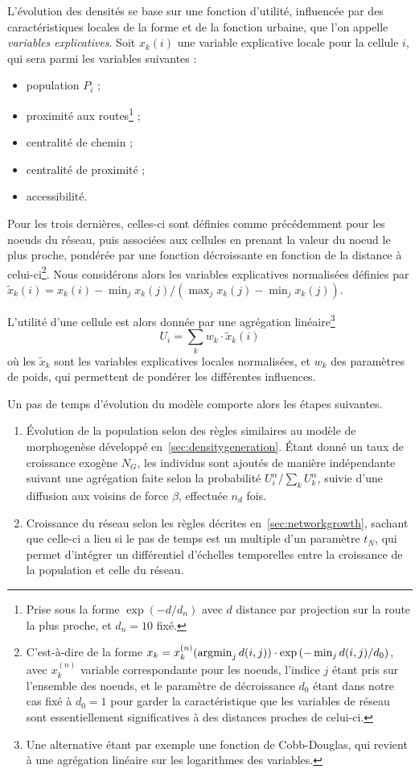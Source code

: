 L'évolution des densités se base sur une fonction d'utilité, influencée par des caractéristiques locales de la forme et de la fonction urbaine, que l'on appelle \emph{variables explicatives}. Soit $x_k(i)$ une variable explicative locale pour la cellule $i$, qui sera parmi les variables suivantes : 
\begin{itemize}
	\item population $P_i$ ;
	\item proximité aux routes\footnote{Prise sous la forme $\exp (-d / d_n)$ avec $d$ distance par projection sur la route la plus proche, et $d_n =10$ fixé.} ;
	\item centralité de chemin ;
	\item centralité de proximité ;
	\item accessibilité.
\end{itemize}
Pour les trois dernières, celles-ci sont définies comme précédemment pour les noeuds du réseau, puis associées aux cellules en prenant la valeur du noeud le plus proche, pondérée par une fonction décroissante en fonction de la distance à celui-ci\footnote{C'est-à-dire de la forme $x_k = x^{(n)}_k (\operatorname*{\arg\!\min}_j d(i,j)) \cdot \exp \left( -  \min_j d(i,j) / d_0 \right)$, avec $x^{(n)}_k$ variable correspondante pour les noeuds, l'indice $j$ étant pris sur l'ensemble des noeuds, et le paramètre de décroissance $d_0$ étant dans notre cas fixé à $d_0 = 1$ pour garder la caractéristique que les variables de réseau sont essentiellement significatives à des distances proches de celui-ci.}. Nous considérons alors les variables explicatives normalisées définies par $\tilde{x}_k(i) = x_k(i) - \min_j x_k(j) / (\max_j x_k(j) - \min_j x_k(j))$. 

L'utilité d'une cellule est alors donnée par une agrégation linéaire\footnote{Une alternative étant par exemple une fonction de Cobb-Douglas, qui revient à une agrégation linéaire sur les logarithmes des variables.}
\begin{equation}
U_i = \sum_k w_k \cdot \tilde{x}_k(i)
\end{equation}
où les $\tilde{x}_k$ sont les variables explicatives locales normalisées, et $w_k$ des paramètres de poids, qui permettent de pondérer les différentes influences.


Un pas de temps d'évolution du modèle comporte alors les étapes suivantes.
\begin{enumerate}
	\item Évolution de la population selon des règles similaires au modèle de morphogenèse développé en~\ref{sec:densitygeneration}. Étant donné un taux de croissance exogène $N_G$, les individus sont ajoutés de manière indépendante suivant une agrégation faite selon la probabilité $U_i^\alpha/\sum_k U_k^\alpha$, suivie d'une diffusion aux voisins de force $\beta$, effectuée $n_d$ fois.
	\item Croissance du réseau selon les règles décrites en~\ref{sec:networkgrowth}, sachant que celle-ci a lieu si le pas de temps est un multiple d'un paramètre $t_N$, qui permet d'intégrer un différentiel d'échelles temporelles entre la croissance de la population et celle du réseau.
\end{enumerate}

